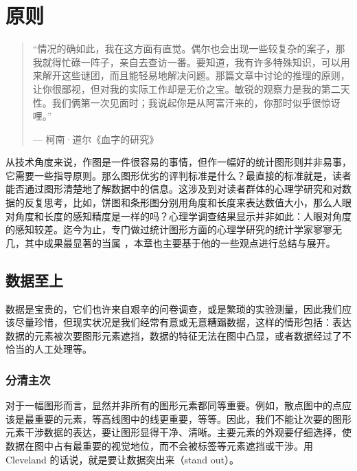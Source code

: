 \documentclass[
  b5paper,
  UTF8,twoside]{book}
\begin{document}
\hypertarget{chap:principle}{%
\chapter{原则}\label{chap:principle}}

\begin{quote}
``情况的确如此，我在这方面有直觉。偶尔也会出现一些较复杂的案子，那我就得忙碌一阵子，亲自去查访一番。要知道，我有许多特殊知识，可以用来解开这些谜团，而且能轻易地解决问题。那篇文章中讨论的推理的原则，让你很鄙视，但对我的实际工作却是无价之宝。敏锐的观察力是我的第二天性。我们俩第一次见面时；我说起你是从阿富汗来的，你那时似乎很惊讶哩。''

\hspace*{\fill} --- 柯南·道尔《血字的研究》
\end{quote}

从技术角度来说，作图是一件很容易的事情，但作一幅好的统计图形则并非易事，它需要一些指导原则。那么图形优劣的评判标准是什么？最直接的标准就是，读者能否通过图形清楚地了解数据中的信息。这涉及到对读者群体的心理学研究和对数据的反复思考，比如，饼图和条形图分别用角度和长度来表达数值大小，那么人眼对角度和长度的感知精度是一样的吗？心理学调查结果显示并非如此：人眼对角度的感知较差。迄今为止，专门做过统计图形方面的心理学研究的统计学家寥寥无几，其中成果最显著的当属 \citet{Cleveland85} ，本章也主要基于他的一些观点进行总结与展开。

\hypertarget{sec:data-priority}{%
\section{数据至上}\label{sec:data-priority}}

数据是宝贵的，它们也许来自艰辛的问卷调查，或是繁琐的实验测量，因此我们应该尽量珍惜，但现实状况是我们经常有意或无意糟蹋数据，这样的情形包括：表达数据的元素被次要图形元素遮挡，数据的特征无法在图中凸显，或者数据经过了不恰当的人工处理等。

\hypertarget{subsec:element-priority}{%
\subsection{分清主次}\label{subsec:element-priority}}

对于一幅图形而言，显然并非所有的图形元素都同等重要。例如，散点图中的点应该是最重要的元素，等高线图中的线更重要，等等。因此，我们不能让次要的图形元素干涉数据的表达，要让图形显得干净、清晰。主要元素的外观要仔细选择，使数据在图中占有最重要的视觉地位，而不会被标签等元素遮挡或干涉。用 Cleveland 的话说，就是要让数据突出来（stand out）。
\end{document}
